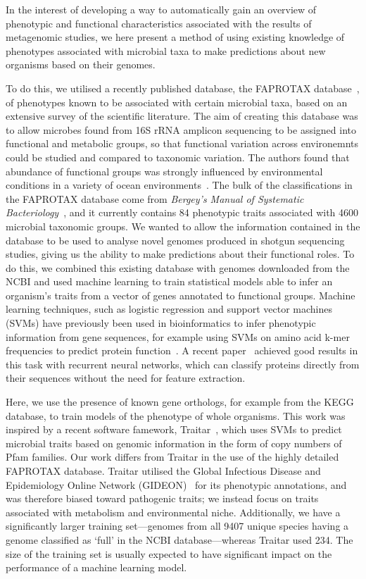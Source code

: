 \documentclass[10pt,letterpaper]{article}
\begin{document}
In the interest of developing a way to automatically gain an overview of phenotypic and functional characteristics associated with the results of metagenomic studies, we here present a method of using existing knowledge of phenotypes associated with microbial taxa to make predictions about new organisms based on their genomes.

To do this, we utilised a recently published database, the FAPROTAX database~\cite{Louca2016,Louca2017}, of phenotypes known to be associated with certain microbial taxa, based on an extensive survey of the scientific literature. The aim of creating this database was to allow microbes found from 16S rRNA amplicon sequencing to be assigned into functional and metabolic groups, so that functional variation across environemnts could be studied and compared to taxonomic variation. The authors found that abundance of functional groups was strongly influenced by environmental conditions in a variety of ocean environments~\cite{Louca2016a}. The bulk of the classifications in the FAPROTAX database come from \emph{Bergey's Manual of Systematic Bacteriology}~\cite{Whitman}, and it currently contains 84 phenotypic traits associated with 4600 microbial taxonomic groups. We wanted to allow the information contained in the database to be used to analyse novel genomes produced in shotgun sequencing studies, giving us the ability to make predictions about their functional roles. To do this, we combined this existing database with genomes downloaded from the NCBI and used machine learning to train statistical models able to infer an organism's traits from a vector of 
genes annotated to functional groups. Machine learning techniques, such as logistic regression and support vector machines (SVMs) have previously been used in bioinformatics to infer phenotypic information from gene sequences, for example using SVMs on amino acid k-mer frequencies to predict protein function~\cite{Leslie2002,Cai2003,Someya2010}. A recent paper~\cite{Asgari2015} achieved good results in this task with recurrent neural networks, which can classify proteins directly from their sequences without the need for feature extraction. 

Here, we use the presence of known gene orthologs, for example from the KEGG database, to train models of the phenotype of whole organisms. This work was inspired by a recent software famework, Traitar~\cite{Weimann2016}, which uses SVMs to predict microbial traits based on genomic information in the form of copy numbers of Pfam families. Our work differs from Traitar in the use of the highly detailed FAPROTAX database. Traitar utilised the Global Infectious Disease and Epidemiology Online Network (GIDEON)~\cite{Berger2005} for its phenotypic annotations, and was therefore biased toward pathogenic traits; we instead focus on traits associated with metabolism and environmental niche. Additionally, we have a significantly larger training set---genomes from all 9407 unique species having a genome classified as `full' in the NCBI database---whereas Traitar used 234. The size of the training set is usually expected to have significant impact on the performance of a machine learning model.
\end{document}
